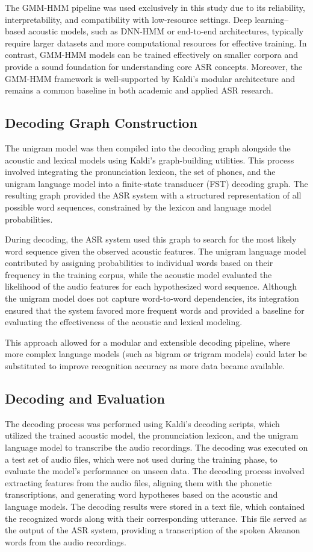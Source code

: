 The GMM-HMM pipeline was used exclusively in this study due to its reliability, interpretability, and compatibility with low-resource settings. Deep learning–based acoustic models, such as DNN-HMM or end-to-end architectures, typically require larger datasets and more computational resources for effective training. In contrast, GMM-HMM models can be trained effectively on smaller corpora and provide a sound foundation for understanding core ASR concepts. Moreover, the GMM-HMM framework is well-supported by Kaldi’s modular architecture and remains a common baseline in both academic and applied ASR research.

\subsection{Decoding Graph Construction}
The unigram model was then compiled into the decoding graph alongside the acoustic and lexical models using Kaldi’s graph-building utilities. This process involved integrating the pronunciation lexicon, the set of phones, and the unigram language model into a finite-state transducer (FST) decoding graph. The resulting graph provided the ASR system with a structured representation of all possible word sequences, constrained by the lexicon and language model probabilities.

During decoding, the ASR system used this graph to search for the most likely word sequence given the observed acoustic features. The unigram language model contributed by assigning probabilities to individual words based on their frequency in the training corpus, while the acoustic model evaluated the likelihood of the audio features for each hypothesized word sequence. Although the unigram model does not capture word-to-word dependencies, its integration ensured that the system favored more frequent words and provided a baseline for evaluating the effectiveness of the acoustic and lexical modeling.

This approach allowed for a modular and extensible decoding pipeline, where more complex language models (such as bigram or trigram models) could later be substituted to improve recognition accuracy as more data became available.

\subsection{Decoding and Evaluation}
The decoding process was performed using Kaldi’s decoding scripts, which utilized the trained acoustic model, the pronunciation lexicon, and the unigram language model to transcribe the audio recordings. The decoding was executed on a test set of audio files, which were not used during the training phase, to evaluate the model's performance on unseen data. The decoding process involved extracting features from the audio files, aligning them with the phonetic transcriptions, and generating word hypotheses based on the acoustic and language models. The decoding results were stored in a text file, which contained the recognized words along with their corresponding utterance. This file served as the output of the ASR system, providing a transcription of the spoken Akeanon words from the audio recordings.

